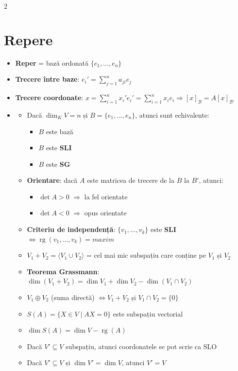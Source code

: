 \documentclass[10pt]{extarticle}
\begin{document}
\begin{multicols*}{2}
\section*{Repere}
\begin{itemize}[leftmargin=*]
  \item \textbf{Reper} = bază ordonată $\{e_1, \dots, e_n\}$
  \item \textbf{Trecere între baze}: $e_i' = \sum_{j=1}^n a_{ji} e_j$
  \item \textbf{Trecere coordonate}: $x = \sum_{i=1}^n x_i' e_i' = \sum_{i=1}^n x_i e_i \Rightarrow [x]_{\mathcal{B}} = A [x]_{\mathcal{B}'}$
  \item \begin{itemize}[leftmargin=*]
    \item Dacă $\dim_K V = n$ și $B = \{e_1, \dots, e_n\}$, atunci sunt echivalente:
    \begin{itemize}[leftmargin=1.5em]
      \item $B$ este bază
      \item $B$ este \textbf{SLI}
      \item $B$ este \textbf{SG}
    \end{itemize}
    \item \textbf{Orientare}: dacă $A$ este matricea de trecere de la $B$ la $B'$, atunci:
    \begin{itemize}[leftmargin=1.5em]
      \item $\det A > 0$ $\Rightarrow$ la fel orientate
      \item $\det A < 0$ $\Rightarrow$ opus orientate
    \end{itemize}
    \item \textbf{Criteriu de independență}: $\{v_1, \dots, v_k\}$ este \textbf{SLI} $\Leftrightarrow \operatorname{rg}(v_1, \dots, v_k) = maxim$
    \item $V_1 + V_2 = \langle V_1 \cup V_2 \rangle$ = cel mai mic subspațiu care conține pe $V_1$ și $V_2$
    \item \textbf{Teorema Grassmann}: $\dim(V_1 + V_2) = \dim V_1 + \dim V_2 - \dim(V_1 \cap V_2)$
    \item $V_1 \oplus V_2$ (suma directă) $\Leftrightarrow V_1 + V_2$ și $V_1 \cap V_2 = \{0\}$
    \item $S(A) = \{ X \in V \mid AX = 0 \}$ este subspațiu vectorial
    \item $\dim S(A) = \dim V - \operatorname{rg}(A)$
    \item Dacă $V' \subseteq V$ subspațiu, atunci coordonatele se pot scrie ca SLO
    \item Dacă $V' \subseteq V$ și $\dim V' = \dim V$, atunci $V' = V$
  \end{itemize}


\end{itemize}
\end{multicols*}
\end{document}
